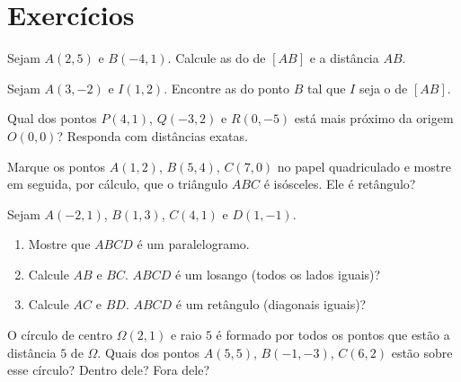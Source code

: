 \section{Exercícios}

\begin{exercise}[$\star$]\label{exo:g10:coordgeom:1}
Sejam $A(2, 5)$ e $B(-4, 1)$. Calcule as  do  de
$[AB]$ e a distância $AB$.
\end{exercise}

\begin{exercise}[$\star$]\label{exo:g10:coordgeom:2}
Sejam $A(3, -2)$ e $I(1, 2)$. Encontre as  do ponto $B$ tal
que $I$ seja o  de $[AB]$.
\end{exercise}

\begin{exercise}[$\star$]\label{exo:g10:coordgeom:3}
Qual dos pontos $P(4, 1)$, $Q(-3, 2)$ e $R(0, -5)$ está mais próximo da
origem $O(0,0)$? Responda com distâncias exatas.
\end{exercise}

\begin{exercise}[$\star$]\label{exo:g10:coordgeom:4}
Marque os pontos $A(1, 2)$, $B(5, 4)$, $C(7, 0)$ no papel quadriculado e
mostre em seguida, por cálculo, que o triângulo $ABC$ é isósceles. Ele é
retângulo?
\end{exercise}

\begin{exercise}[$\star\star$]\label{exo:g10:coordgeom:5}
Sejam $A(-2, 1)$, $B(1, 3)$, $C(4, 1)$ e $D(1, -1)$.
\begin{enumerate}
  \item Mostre que $ABCD$ é um paralelogramo.
  \item Calcule $AB$ e $BC$. $ABCD$ é um losango (todos os lados
        iguais)?
  \item Calcule $AC$ e $BD$. $ABCD$ é um retângulo (diagonais iguais)?
\end{enumerate}
\end{exercise}

\begin{exercise}[$\star\star$]\label{exo:g10:coordgeom:6}
O círculo de centro $\Omega(2, 1)$ e raio $5$ é formado por todos os
pontos que estão a distância $5$ de $\Omega$. Quais dos pontos
$A(5, 5)$, $B(-1, -3)$, $C(6, 2)$ estão sobre esse círculo? Dentro dele?
Fora dele?
\end{exercise}


